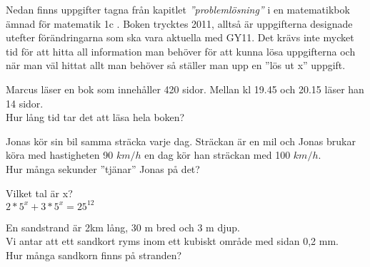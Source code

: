 \textcolor{WildStrawberry}{
    Nedan finns uppgifter tagna från  kapitlet \textit{''problemlösning''} i en matematikbok ämnad för matematik 1c \cite{matte5000}. Boken trycktes 2011, alltså är uppgifterna designade utefter förändringarna som ska vara aktuella med GY11. Det krävs inte mycket tid för att hitta all information man behöver för att kunna lösa uppgifterna och när man väl hittat allt man behöver så ställer man upp en ''lös ut x'' uppgift.}



\begin{displayquote}
\textcolor{turkos}{Marcus läser en bok som innehåller 420 sidor. Mellan kl 19.45 och 20.15 läser han 14 sidor. \\
Hur lång tid tar det att läsa hela boken?}
\end{displayquote}


\begin{displayquote}
\textcolor{turkos}{Jonas kör sin bil samma sträcka varje dag. Sträckan är en mil och Jonas brukar köra med hastigheten 90 $km/h$ en dag kör han sträckan med 100 $km/h$. \\
Hur många sekunder ''tjänar'' Jonas på det?}
\end{displayquote}



\begin{displayquote}
\textcolor{turkos}{Vilket tal är x?\\
\( 2*5^x + 3*5^x = 25^{12} \)}
\end{displayquote}


\begin{displayquote}
\textcolor{turkos}{En sandstrand är 2km lång, 30 m bred och 3 m djup. \\
Vi antar att ett sandkort ryms inom ett kubiskt område med sidan 0,2 mm.\\
Hur många sandkorn finns på stranden?}
\end{displayquote}


